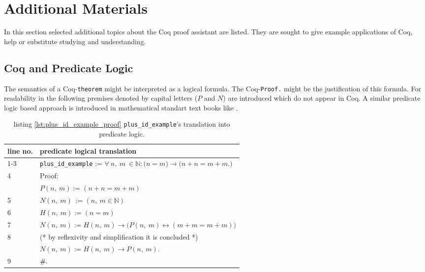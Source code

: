 \section{Additional Materials}
\label{app:AdditionalMaterials}

In this section selected additional topics about the Coq proof assistant are listed.
They are sought to give example applications of Coq, help or substitute studying and understanding.

\subsection{Coq and Predicate Logic} 
\label{subsec:CoqAndPredicateLogic}

	The semantics of a Coq-\lstinline!theorem! might be interpreted as a logical formula.
	The Coq-\lstinline!Proof.! might be the justification of this formula. 
	For readability in the following premises denoted by capital letters ($P$ and $N$) are introduced which do not appear in Coq. A similar predicate logic based approach is introduced in mathematical standart text books like \cite[Kapitel 1.4.3. Anmerkungen zur Struktur mathematischer Sätze und ihrer Formulierung in der Sparche der Mengenlehre]{Z06}.  
	
	\begin{table}[h]
		\begin{left}
			\begin{tabular}{l|l}
	 			line no.  &  predicate logical translation \\ \hline 
		     	  1-3    %
		                  & \lstinline!plus_id_example! := $ \forall\ n, \ m\ \in \mathbb{N}: \big(n = m \big) \rightarrow \big( n+n = m+m. \big) $ \\ \hline        
		     	  4       & Proof: \\     \hline	     	      	                      
		                  &   $P( n,\ m):= (n+n = m+m)$    \\
		          5       &   $N( n, \ m) \ := ( n,\ m \in \mathbb{N})$       \\ \hline       
		          6       &   $H(n, \ m) := (n = m)$ \\        
		    	      7   &   $N (n,\ m) :=  H(n, \ m) \rightarrow \Big(P( n, \ m) \leftrightarrow( m+m = m+m) \Big)$\\   \hline 
		          8       &   (* by reflexivity and simplification it is concluded *) \\
		                  & $N(n, \ m) :=  H( n, \ m) \rightarrow P( n, \ m)$.  \\  \hline
		          9       & $\qed.$\\      	          
	        		\end{tabular}
		\end{left}
		\label{tab:CoqAndPreciateLogic}
		\caption{listing \ref{lst:plus_id_example_proof} \lstinline!plus_id_example!'s translation into predicate logic.} 
	\end{table}


